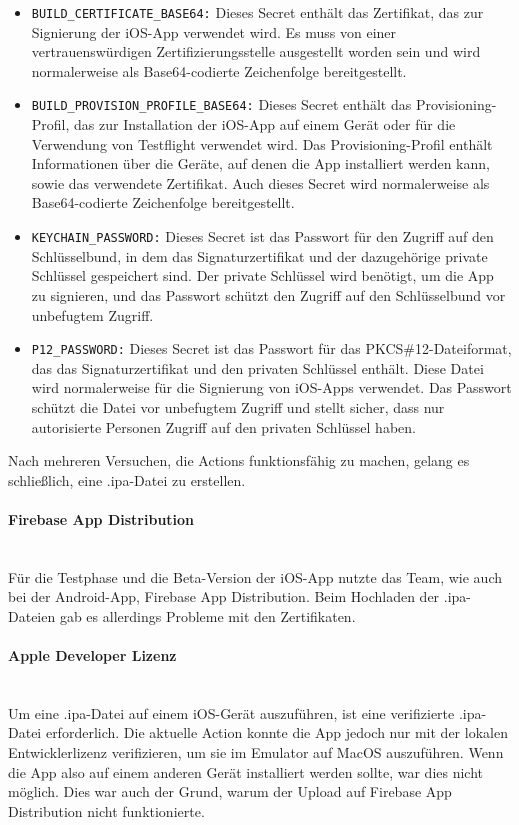 \begin{itemize}
  \item \verb|BUILD_CERTIFICATE_BASE64:| Dieses Secret enthält das Zertifikat, das zur Signierung der iOS-App verwendet wird. Es muss von einer vertrauenswürdigen Zertifizierungsstelle ausgestellt worden sein und wird normalerweise als Base64-codierte Zeichenfolge bereitgestellt.
  \item \verb|BUILD_PROVISION_PROFILE_BASE64:| Dieses Secret enthält das Provisioning-Profil, das zur Installation der iOS-App auf einem Gerät oder für die Verwendung von Testflight verwendet wird. Das Provisioning-Profil enthält Informationen über die Geräte, auf denen die App installiert werden kann, sowie das verwendete Zertifikat. Auch dieses Secret wird normalerweise als Base64-codierte Zeichenfolge bereitgestellt.
  \item \verb|KEYCHAIN_PASSWORD:| Dieses Secret ist das Passwort für den Zugriff auf den Schlüsselbund, in dem das Signaturzertifikat und der dazugehörige private Schlüssel gespeichert sind. Der private Schlüssel wird benötigt, um die App zu signieren, und das Passwort schützt den Zugriff auf den Schlüsselbund vor unbefugtem Zugriff.
  \item \verb|P12_PASSWORD:| Dieses Secret ist das Passwort für das PKCS\#12-Dateiformat, das das Signaturzertifikat und den privaten Schlüssel enthält. Diese Datei wird normalerweise für die Signierung von iOS-Apps verwendet. Das Passwort schützt die Datei vor unbefugtem Zugriff und stellt sicher, dass nur autorisierte Personen Zugriff auf den privaten Schlüssel haben.
\end{itemize}

Nach mehreren Versuchen, die Actions funktionsfähig zu
machen, gelang es schließlich, eine .ipa-Datei zu erstellen.

\paragraph{Firebase App Distribution}\mbox{} \\
Für die Testphase und die Beta-Version der iOS-App nutzte
das Team, wie auch bei der Android-App, Firebase App
Distribution. Beim Hochladen der .ipa-Dateien gab es
allerdings Probleme mit den Zertifikaten.

\paragraph{Apple Developer Lizenz}\mbox{} \\
Um eine .ipa-Datei auf einem iOS-Gerät auszuführen, ist eine verifizierte .ipa-Datei erforderlich. Die aktuelle Action konnte die App jedoch nur mit der lokalen Entwicklerlizenz verifizieren, um sie im Emulator auf MacOS auszuführen. Wenn die App also auf einem anderen Gerät installiert werden sollte, war dies nicht möglich. Dies war auch der Grund, warum der Upload auf Firebase App Distribution nicht funktionierte.

